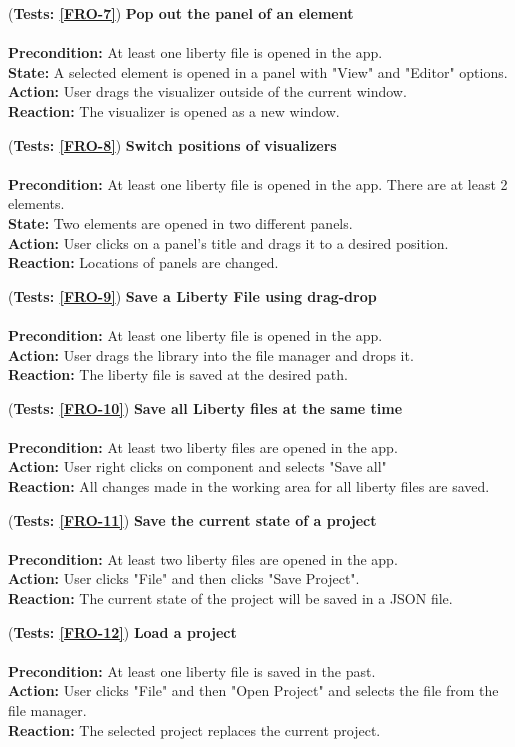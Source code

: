 \documentclass[10pt,a4paper]{report}
\newcommand{\precondition}[1]{
    \textbf{Precondition: } #1 \leavevmode \\
}
\newcommand{\action}[1]{
    \textbf{Action: } #1 \leavevmode \\
}
\newcommand{\state}[1]{
    \textbf{State: } #1 \leavevmode \\
}
\newcommand{\reaction}[1]{
    \textbf{Reaction: } #1 \leavevmode \\
}
\newcommand{\GTCODescription}[2]{
    (\textbf{Tests: #1}) \textbf{#2} \leavevmode \\
}
\begin{document}
\begin{GTCO}
    \item \GTCODescription{\ref{FRO-7}}{Pop out the panel of an element} \leavevmode \\ \precondition{At least one liberty file is opened in the app.}\state{A selected element is opened in a panel with "View" and "Editor" options.}\action{User drags the visualizer outside of the current window.}\reaction{The visualizer is opened as a new window.}
    
    \item \GTCODescription{\ref{FRO-8}}{Switch positions of visualizers} \leavevmode \\ \precondition{At least one liberty file is opened in the app. There are at least 2 elements.}\state{Two elements are opened in two different panels.}\action{User clicks on a panel’s title and drags it to a desired position.}\reaction{Locations of panels are changed.}
    
    
    \item \GTCODescription{\ref{FRO-9}}{Save a Liberty File using drag-drop} \leavevmode \\ \precondition{At least one liberty file is opened in the app.}\action{User drags the library into the file manager and drops it.}\reaction{The liberty file is saved at the desired path.}
    
    \item \GTCODescription{\ref{FRO-10}}{Save all Liberty files at the same time} \leavevmode \\ \precondition{At least two liberty files are opened in the app.}\action{User right clicks on component and selects "Save all"}\reaction{All changes made in the working area for all liberty files are saved.}
    
    \item \GTCODescription{\ref{FRO-11}}{Save the current state of a project}\leavevmode \\ \precondition{ At least two liberty files are opened in the app.}\action{User clicks "File" and then clicks "Save Project".}\reaction{The current state of the project will be saved in a JSON file.}
    
    \item \GTCODescription{\ref{FRO-12}}{Load a project} \leavevmode \\ \precondition{At least one liberty file is saved in the past.}\action{User clicks "File" and then "Open Project" and selects the file from the file manager.}\reaction{The selected project replaces the current project.}
    

\end{GTCO}
\end{document}
